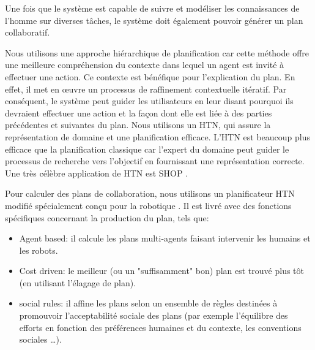 \documentclass[a4paper,11pt,twoside]{StyleThese}
\begin{document}


Une fois que le système est capable de suivre et modéliser les connaissances de l'homme sur diverses tâches, le système doit également pouvoir générer un plan collaboratif.

Nous utilisons une approche hiérarchique de planification car cette méthode offre une meilleure compréhension du contexte dans lequel un agent est invité à effectuer une action. Ce contexte est bénéfique pour l'explication du plan. En effet, il met en œuvre un processus de raffinement contextuelle itératif. Par conséquent, le système peut guider les utilisateurs en leur disant pourquoi ils devraient effectuer une action et la façon dont elle est liée à des parties précédentes et suivantes du plan.
Nous utilisons un HTN, qui assure la représentation de domaine et une planification efficace.
L'HTN est beaucoup plus efficace que la planification classique car l'expert du domaine peut guider le processus de recherche vers l'objectif en fournissant une représentation correcte.
Une très célèbre application de HTN est SHOP \cite{Nau99}.

Pour calculer des plans de collaboration, nous utilisons un planificateur HTN modifié spécialement conçu pour la robotique \cite{lallement14}.
Il est livré avec des fonctions spécifiques concernant la production du plan, tels que:

\begin{itemize}
\item Agent based: il calcule les plans multi-agents faisant intervenir les humains et les robots.
\item Cost driven: le meilleur (ou un "suffisamment" bon) plan est trouvé plus tôt (en utilisant l'élagage de plan).
\item social rules: il affine les plans selon un ensemble de règles destinées à promouvoir l'acceptabilité sociale des plans (par exemple l'équilibre des efforts  en fonction des préférences humaines et du contexte, les conventions sociales \ldots).
\end{itemize}
\end{document}
